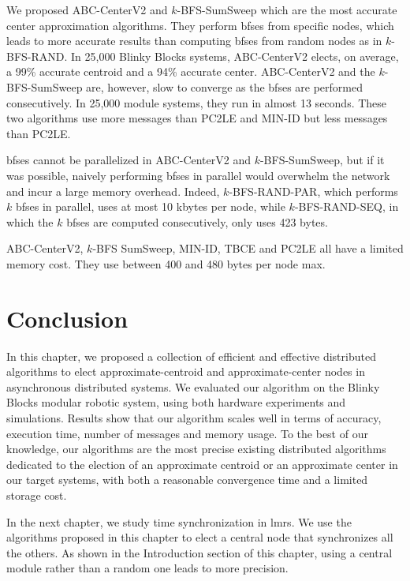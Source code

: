 We proposed ABC-CenterV2 and $k$-BFS-SumSweep which are the most accurate center approximation algorithms. They perform \gls{bfses} from specific nodes, which leads to more accurate results than computing \gls{bfses} from random nodes as in $k$-BFS-RAND. In 25,000 Blinky Blocks systems, ABC-CenterV2 elects, on average, a 99\% accurate centroid and a 94\% accurate center. ABC-CenterV2 and the $k$-BFS-SumSweep are, however, slow to converge as the \gls{bfses} are performed consecutively. In 25,000 module systems, they run in almost 13 seconds. These two algorithms use more messages than PC2LE and MIN-ID but less messages than PC2LE.

\gls{bfses} cannot be parallelized in ABC-CenterV2 and $k$-BFS-SumSweep, but if it was possible, naively performing \gls{bfses} in parallel would overwhelm the network and incur a large memory overhead. Indeed, $k$-BFS-RAND-PAR, which performs $k$ \gls{bfses} in parallel, uses at most 10 kbytes per node, while $k$-BFS-RAND-SEQ, in which the $k$ \gls{bfses} are computed consecutively, only uses 423 bytes.

ABC-CenterV2, $k$-BFS SumSweep, MIN-ID, TBCE and PC2LE all have a limited memory cost. They use between 400 and 480 bytes per node max.

\section{Conclusion}
\label{section:centrality:conclusion}

In this chapter, we proposed a collection of efficient and effective distributed algorithms to elect approximate-centroid and approximate-center nodes in asynchronous distributed systems. We evaluated our algorithm on the Blinky Blocks modular robotic system, using both hardware experiments and simulations. Results show that our algorithm scales well in terms of accuracy, execution time, number of messages and memory usage. To the best of our knowledge, our algorithms are the most precise existing distributed algorithms dedicated to the election of an approximate centroid or an approximate center in our target systems, with both a reasonable convergence time and a limited storage cost.

In the next chapter, we study time synchronization in \gls{lmrs}. We use the algorithms proposed in this chapter to elect a central node that synchronizes all the others. As shown in the Introduction section of this chapter, using a central module rather than a random one leads to more precision.